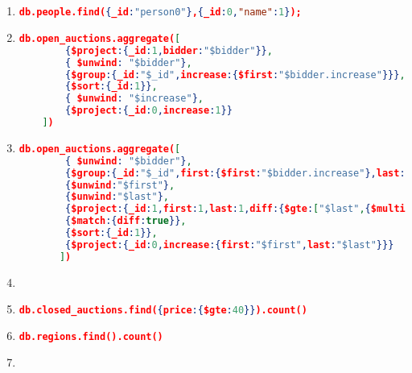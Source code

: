 \label{xmark-queries-mongodb}
\begin{enumerate}[label=Q\arabic*.]
	\item %
	\begin{lstlisting}[language=JSON,   basicstyle=\scriptsize]
		db.people.find({_id:"person0"},{_id:0,"name":1});
	\end{lstlisting}
	
	\item %
	\begin{lstlisting}[language=JSON,  basicstyle=\scriptsize]
	db.open_auctions.aggregate([
		{$project:{_id:1,bidder:"$bidder"}},
		{ $unwind: "$bidder"},
		{$group:{_id:"$_id",increase:{$first:"$bidder.increase"}}},
		{$sort:{_id:1}},
		{ $unwind: "$increase"},
		{$project:{_id:0,increase:1}}
	])
	\end{lstlisting}
	
    \item %
	\begin{lstlisting}[language=JSON,   basicstyle=\scriptsize]
	   db.open_auctions.aggregate([
		{ $unwind: "$bidder"},
		{$group:{_id:"$_id",first:{$first:"$bidder.increase"},last:{$last:"$bidder.increase"}}},
		{$unwind:"$first"},
		{$unwind:"$last"},
		{$project:{_id:1,first:1,last:1,diff:{$gte:["$last",{$multiply:["$first",2]}]}}},
		{$match:{diff:true}},
		{$sort:{_id:1}},
		{$project:{_id:0,increase:{first:"$first",last:"$last"}}}
	   ])
	\end{lstlisting}
	
	
    \item %
	\par
	
	
    \item %
	\begin{lstlisting}[language=JSON,   basicstyle=\scriptsize]
	   db.closed_auctions.find({price:{$gte:40}}).count()
	\end{lstlisting}
	
    \item %
	\begin{lstlisting}[language=JSON,   basicstyle=\scriptsize]
	   db.regions.find().count()
	\end{lstlisting}
	
	
    \item %
	\par
	

\end{enumerate}
